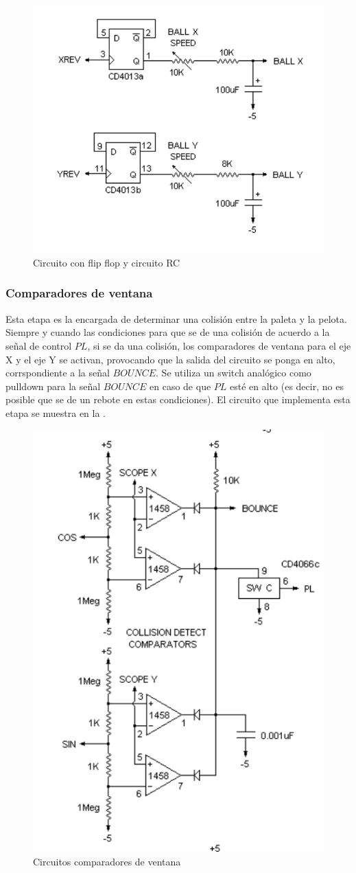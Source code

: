 \begin{figure}[H]
    \centering
    \includegraphics[width=0.5\linewidth]{figs/descripcion/ffRC.png}
    \caption{Circuito con flip flop y circuito RC \cite{pong}}
    \label{ffRC}
\end{figure}

\subsubsection{Comparadores de ventana}
Esta etapa es la encargada de determinar una colisión entre la paleta y la pelota.
Siempre y cuando las condiciones para que se de una colisión de acuerdo a la señal de control $PL$, si se da una colisión, los comparadores de ventana para el eje X y el eje Y se activan, provocando que la salida del circuito se ponga en alto, corrspondiente a la señal $BOUNCE$.
Se utiliza un switch analógico como pulldown para la señal $BOUNCE$ en caso de que $PL$ esté en alto (es decir, no es posible que se de un rebote en estas condiciones).
El circuito que implementa esta etapa se muestra en la .

\begin{figure}[H]
    \centering
    \includegraphics[width=0.5\linewidth]{figs/descripcion/comparadores}
    \caption{Circuitos comparadores de ventana \cite{pong}}
    \label{comparadores}
\end{figure}

